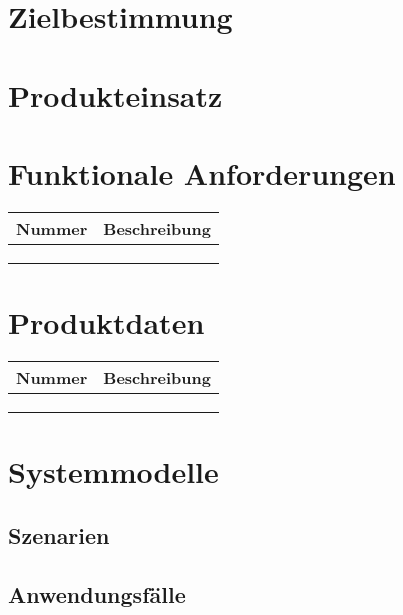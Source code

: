 \documentclass[a4paper,12pt]{article}
\newcommand\addrow[2]{#1 &#2\\ }
\newcommand\addheading[2]{#1 &#2\\ \hline}
\newcommand\tabularhead{\begin{tabular}{lp{13cm}}
\hline
}
\newenvironment{usecase}{\tabularhead}
{\hline\end{tabular}}
\begin{document}
 \setcounter{page}{2}
 \tableofcontents          %
 \clearpage
 
\section{Zielbestimmung}


\section{Produkteinsatz}


\section{Funktionale Anforderungen}
\begin{usecase}
  \addheading{Nummer}{Beschreibung} 
  \addrow{}{}
  \addrow{}{}
  \addrow{}{}
\end{usecase}

\section{Produktdaten}
\begin{usecase}
  \addheading{Nummer}{Beschreibung} 
  \addrow{}{}
  \addrow{}{}
  \addrow{}{}
\end{usecase}

\section{Systemmodelle}
\subsection{Szenarien}
\subsection{Anwendungsfälle}

\clearpage
 
\end{document}
